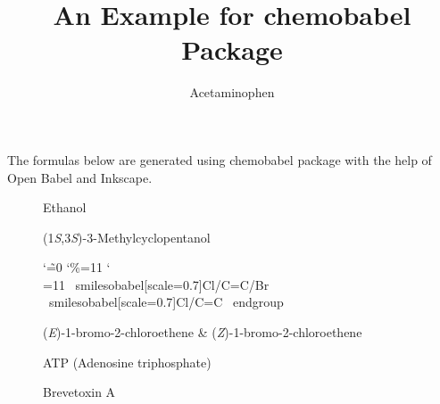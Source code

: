 \documentclass{article}
\title{An Example for \textsf{chemobabel} Package}
\author{Acetaminophen}
\begin{document}
\maketitle

The formulas below are generated using \textsf{chemobabel} package with the help of Open Babel and Inkscape.

\begin{figure}[ht]
  \centering
  \caption{Ethanol}
\end{figure}

\begin{figure}[ht]
  \centering
  \caption{(1\textit{S},3\textit{S})-3-Methylcyclopentanol}
\end{figure}

\begin{figure}[ht]
   \centering
  \begingroup
    \catcode`\~=0
    \catcode`\%=11
    \catcode`\\=11
    ~smilesobabel[scale=0.7]{Cl/C=C/Br}{}
    ~smilesobabel[scale=0.7]{Cl/C=C\Br}{}
  ~endgroup
  \caption{(\textit{E})-1-bromo-2-chloroethene \& (\textit{Z})-1-bromo-2-chloroethene}
\end{figure}

\begin{figure}[ht]
  \centering
  \caption{ATP (Adenosine triphosphate)}
\end{figure}

\begin{figure}[ht]
  \centering
  \caption{Brevetoxin A}
\end{figure}
\end{document}
